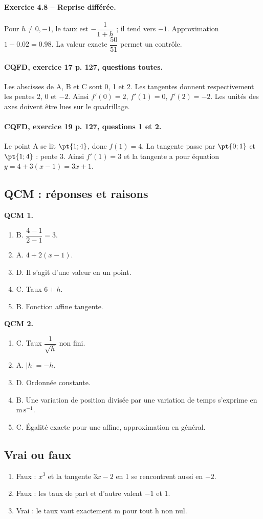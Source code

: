 \paragraph{Exercice 4.8 -- Reprise différée.} Pour $h\ne0,-1$, le taux est $-\dfrac{1}{1+h}$ ; il tend vers $-1$. Approximation $1-\num{0,02}=\num{0,98}$. La valeur exacte $\dfrac{50}{51}$ permet un contrôle.
\paragraph{CQFD, exercice 17 p. 127, questions toutes.} Les abscisses de A, B et C sont 0, 1 et 2. Les tangentes donnent respectivement les pentes 2, 0 et $-2$. Ainsi $f\prime(0)=2$, $f\prime(1)=0$, $f\prime(2)=-2$. Les unités des axes doivent être lues sur le quadrillage.
\paragraph{CQFD, exercice 19 p. 127, questions 1 et 2.} Le point A se lit $\pt{1;4}$, donc $f(1)=4$. La tangente passe par $\pt{0;1}$ et $\pt{1;4}$ : pente 3. Ainsi $f\prime(1)=3$ et la tangente a pour équation $y=4+3(x-1)=3x+1$.
\subsection*{QCM : réponses et raisons}
\textbf{QCM 1.}
\begin{enumerate}
\item B. $\dfrac{4-1}{2-1}=3$.
\item A. $4+2(x-1)$.
\item D. Il s’agit d’une valeur en un point.
\item C. Taux $6+h$.
\item B. Fonction affine tangente.
\end{enumerate}
\textbf{QCM 2.}
\begin{enumerate}
\item C. Taux $\dfrac{1}{\sqrt h}$ non fini.
\item A. $|h|=-h$.
\item D. Ordonnée constante.
\item B. Une variation de position divisée par une variation de temps s’exprime en $\mathrm{m\,s^{-1}}$.
\item C. Égalité exacte pour une affine, approximation en général.
\end{enumerate}
\subsection*{Vrai ou faux}
\begin{enumerate}
\item Faux : $x^3$ et la tangente $3x-2$ en 1 se rencontrent aussi en $-2$.
\item Faux : les taux de part et d’autre valent $-1$ et 1.
\item Vrai : le taux vaut exactement m pour tout h non nul.
\end{enumerate}
